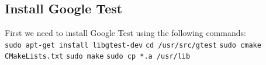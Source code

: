 \documentclass[10pt]{article}
\begin{document}
\subsection{Install Google Test}
First we need to install Google Test using the following commands:\\
\texttt{sudo apt-get install libgtest-dev}
\newline
\texttt{cd /usr/src/gtest}
\newline
\texttt{sudo cmake CMakeLists.txt}
\newline
\texttt{sudo make}
\newline
\texttt{sudo cp *.a /usr/lib}
\end{document}
